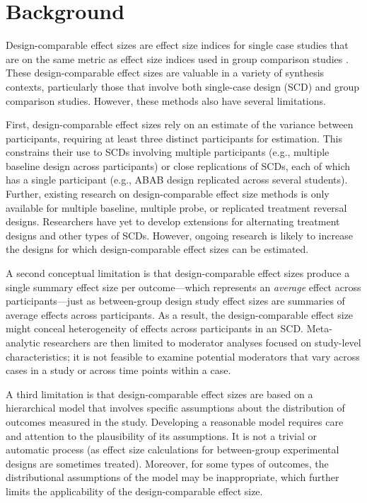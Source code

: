 \documentclass[
]{book}
\begin{document}
\hypertarget{background-1}{%
\section{Background}\label{background-1}}

Design-comparable effect sizes are effect size indices for single case studies that are on the same metric as effect size indices used in group comparison studies \citep{Hedges2012ABk, Hedges2012MB, Pustejovsky2014design, Shadish2013d, Swaminathan2014effect, VandenNoortgate2008multilevel}. These design-comparable effect sizes are valuable in a variety of synthesis contexts, particularly those that involve both single-case design (SCD) and group comparison studies. However, these methods also have several limitations.

First, design-comparable effect sizes rely on an estimate of the variance between participants, requiring at least three distinct participants for estimation.
This constrains their use to SCDs involving multiple participants (e.g., multiple baseline design across participants) or close replications of SCDs, each of which has a single participant (e.g., ABAB design replicated across several students).
Further, existing research on design-comparable effect size methods is only available for multiple baseline, multiple probe, or replicated treatment reversal designs.
Researchers have yet to develop extensions for alternating treatment designs and other types of SCDs. However, ongoing research is likely to increase the designs for which design-comparable effect sizes can be estimated.

A second conceptual limitation is that design-comparable effect sizes produce a single summary effect size per outcome---which represents an \emph{average} effect across participants---just as between-group design study effect sizes are summaries of average effects across participants.
As a result, the design-comparable effect size might conceal heterogeneity of effects across participants in an SCD. Meta-analytic researchers are then limited to moderator analyses focused on study-level characteristics; it is not feasible to examine potential moderators that vary across cases in a study or across time points within a case.

A third limitation is that design-comparable effect sizes are based on a hierarchical model that involves specific assumptions about the distribution of outcomes measured in the study.
Developing a reasonable model requires care and attention to the plausibility of its assumptions.
It is not a trivial or automatic process (as effect size calculations for between-group experimental designs are sometimes treated). Moreover, for some types of outcomes, the distributional assumptions of the model may be inappropriate, which further limits the applicability of the design-comparable effect size.
\end{document}
